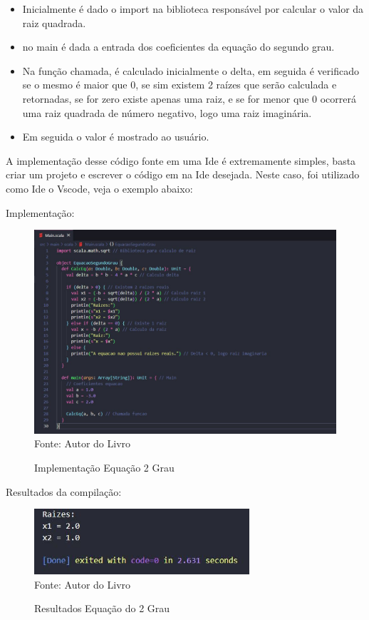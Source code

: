  	\begin{itemize}
 		\item Inicialmente é dado o import na biblioteca responsável por calcular o valor da raiz quadrada.
 		
 		\item no main é dada a entrada dos coeficientes da equação do segundo grau.
 		
 		\item Na função chamada, é calculado inicialmente o delta, em seguida é verificado se o mesmo é maior que 0, se sim existem 2 raízes que serão calculada e retornadas, se for zero existe apenas uma raiz, e se for menor que 0 ocorrerá uma raiz quadrada de número negativo, logo uma raiz imaginária.
 		
 		\item Em seguida o valor é mostrado ao usuário.
 	\end{itemize}
 
 	A implementação desse código fonte em uma Ide é extremamente simples, basta criar um projeto e escrever o código em na Ide desejada. Neste caso, foi utilizado como Ide o Vscode, veja o exemplo abaixo:
 	
 	Implementação:
 	
 	\begin{figure}[H]
 		\centering
 		\caption{Implementação Equação 2 Grau}
 		\label{Implementação Equação 2 Grau}
 		\includegraphics[width=17cm]{Pictures/Eq2Grau.jpg} \\
 		Fonte: Autor do Livro
 	\end{figure}
 	
 	Resultados da compilação:
 	
 	\begin{figure}[H]
		\centering
		\caption{Resultados Equação do 2 Grau}
		\label{Resultados Equação do 2 Grau}
		\includegraphics[width=8cm]{Pictures/resEq2Grau.jpg} \\
		Fonte: Autor do Livro
	\end{figure}


